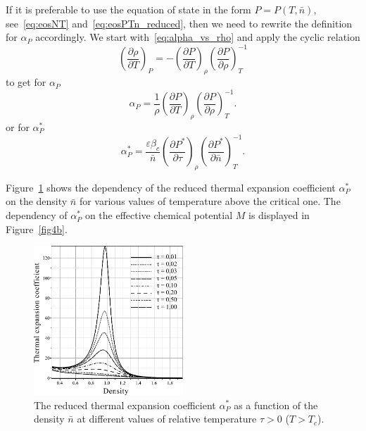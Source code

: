 \documentclass[12pt]{article}
\begin{document}
	If it is preferable to use the equation of state in the form $P=P(T, \bar{n})$, see~\eqref{eq:eosNT} and~\eqref{eq:eosPTn_reduced}, then we need to rewrite the definition for $\alpha_P$ accordingly. We start with~\eqref{eq:alpha_vs_rho} and apply the cyclic relation
	\begin{equation}
		\left(\frac{\partial \rho}{\partial T}\right)_P = - \left(\frac{\partial P}{\partial T}\right)_{\rho} \left(\frac{\partial P}{\partial \rho}\right)^{-1}_T
	\end{equation}
	to get for $\alpha_P$
	\begin{equation}
		\alpha_P = \frac{1}{\rho} \left(\frac{\partial P}{\partial T}\right)_{\rho} \left(\frac{\partial P}{\partial \rho}\right)^{-1}_T.
	\end{equation}
	or for $\alpha^*_P$
	\begin{equation}
		\alpha^*_P = \frac{\varepsilon\beta_c}{\bar{n}} \left(\frac{\partial P^*}{\partial \tau}\right)_{\rho} \left(\frac{\partial P^*}{\partial \bar{n}}\right)^{-1}_T.
	\end{equation}
	
	Figure~\ref{fig4a} shows the dependency of the reduced thermal expansion coefficient $\alpha^*_P$ on the density $\bar{n}$ for various values of temperature above the critical one. The dependency of $\alpha^*_P$ on the effective chemical potential $M$ is displayed in Figure~\ref{fig4b}.
	
	\begin{figure}[h!]
		\centering \includegraphics[width=0.5\textwidth]{f4a.pdf}
		\vskip-3mm\caption{The reduced thermal expansion coefficient $\alpha^*_P$ as a function of the density $\bar n$ at different values of relative temperature $\tau > 0$ ($T > T_c$). 
		}\label{fig4a}
	\end{figure}
	
\end{document}
